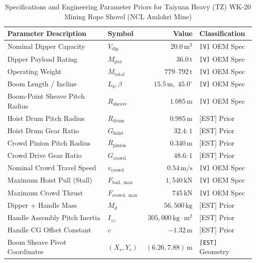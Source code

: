 \documentclass[journal]{IEEEtran}
\begin{document}
\begin{table}[t]
\caption{Specifications and Engineering Parameter Priors for Taiyuan Heavy (TZ) WK-20 Mining Rope Shovel (NCL Amlohri Mine)}
\label{tab:wk20_params}
\centering
\begin{tabular}{llrl}
\toprule
\textbf{Parameter Description} & \textbf{Symbol} & \textbf{Value} & \textbf{Classification} \\
\midrule
Nominal Dipper Capacity & $V_{\mathrm{dip}}$ & $20.0\,\mathrm{m^3}$ & \texttt{[V]} OEM Spec \\
Dipper Payload Rating & $M_{\mathrm{pay}}$ & $36.0\,\mathrm{t}$ & \texttt{[V]} OEM Spec \\
Operating Weight & $M_{\mathrm{total}}$ & $779\text{--}792\,\mathrm{t}$ & \texttt{[V]} OEM Spec \\
Boom Length / Incline & $L_b, \beta$ & $15.5\,\mathrm{m},\; 45.0^\circ$ & \texttt{[V]} OEM Spec \\
Boom-Point Sheave Pitch Radius & $R_{\mathrm{sheave}}$ & $1.085\,\mathrm{m}$ & \texttt{[V]} OEM Spec \\
Hoist Drum Pitch Radius & $R_{\mathrm{drum}}$ & $0.985\,\mathrm{m}$ & [EST] Prior \\
Hoist Drum Gear Ratio & $G_{\mathrm{hoist}}$ & $32.4:1$ & [EST] Prior \\
Crowd Pinion Pitch Radius & $R_{\mathrm{pinion}}$ & $0.340\,\mathrm{m}$ & [EST] Prior \\
Crowd Drive Gear Ratio & $G_{\mathrm{crowd}}$ & $48.6:1$ & [EST] Prior \\
Nominal Crowd Travel Speed & $v_{\mathrm{crowd}}$ & $0.54\,\mathrm{m/s}$ & \texttt{[V]} OEM Spec \\
Maximum Hoist Pull (Stall) & $F_{\mathrm{bail,\max}}$ & $1,540\,\mathrm{kN}$ & \texttt{[V]} OEM Spec \\
Maximum Crowd Thrust & $F_{\mathrm{crowd,\max}}$ & $745\,\mathrm{kN}$ & \texttt{[V]} OEM Spec \\
Dipper + Handle Mass & $M_d$ & $56,500\,\mathrm{kg}$ & [EST] Prior \\
Handle Assembly Pitch Inertia & $I_{zz}$ & $305,000\,\mathrm{kg\cdot m^2}$ & [EST] Prior \\
Handle CG Offset Constant & $c$ & $-1.32\,\mathrm{m}$ & [EST] Prior \\
Boom Sheave Pivot Coordinates & $(X_s, Y_s)$ & $(6.26, 7.88)\,\mathrm{m}$ & \texttt{[EST]} Geometry \\
\bottomrule
\end{tabular}
\end{table}
\end{document}
